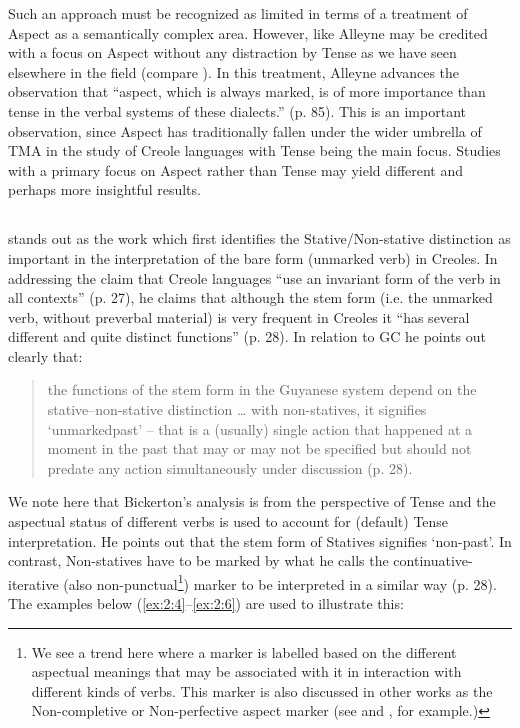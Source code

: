Such an approach must be recognized as limited in terms of a treatment
of Aspect as a semantically complex area.  However, like
\citet{Voorhoeve1957} Alleyne may be credited with a focus on Aspect
without any distraction by Tense as we have seen elsewhere in the
field (compare \citealt{Bickerton1975}).  In this treatment, Alleyne
advances the observation that “aspect, which is always marked, is of
more importance than tense in the verbal systems of these dialects.”
(p. 85).  This is an important observation, since Aspect has traditionally
fallen under the wider umbrella of TMA in the study of Creole
languages with Tense being the main focus.  Studies with a primary
focus on Aspect rather than Tense may yield different and perhaps more
insightful results.

\subsection{\citet{Bickerton1975}}\label{sec:2.1.3}

\citet{Bickerton1975} stands out as the work which first identifies
the Stative\slash Non-stative distinction as important in the interpretation
of the bare form (unmarked verb) in Creoles.  In addressing the claim
that Creole languages “use an invariant form of the verb in all
contexts” (p. 27), he claims that although the stem form (i.e. the
unmarked verb, without preverbal material) is very frequent in Creoles
it “has several different and quite distinct functions” (p. 28).  In
relation to GC he points out clearly that:

\begin{quote}
the functions of the stem form in the Guyanese system depend on the
sta\-tive--non-stative distinction … with non-statives, it signifies
`unmarked\linebreak past' – that is a (usually) single action that happened at a
moment in the past that may or may not be specified but should not
predate any action simultaneously under discussion (p. 28).
\end{quote}

We note here that Bickerton’s analysis is from the perspective of
Tense and the aspectual status of different verbs is used to account
for (default) Tense interpretation.  He points out that the stem form
of Statives signifies `non-past'.  In contrast, Non-statives have to
be marked by what he calls the continuative-iterative (also
non-punctual\footnote{We see a trend here where a marker is labelled
  based on the different aspectual meanings that may be associated
  with it in interaction with different kinds of verbs. This marker is
  also discussed in other works as the Non-completive or
  Non-perfective aspect marker (see \citet{Voorhoeve1957} and
  \citet{Alleyne1980}, for example.)}) marker to be interpreted in a
similar way (p. 28).  The examples below
(\ref{ex:2:4}--\ref{ex:2:6}) are used to illustrate this:

